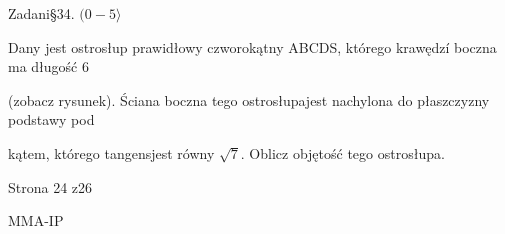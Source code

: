 \documentclass[a4paper,12pt]{article}
\begin{document}
Zadani\S 34. $(0-5\rangle$

Dany jest ostrosłup prawidłowy czworokątny ABCDS, którego krawędzí boczna ma długość 6

(zobacz rysunek). Ściana boczna tego ostrosłupajest nachylona do płaszczyzny podstawy pod

kątem, którego tangensjest równy $\sqrt{7}$. Oblicz objętość tego ostrosłupa.

Strona 24 z26

MMA-IP
\end{document}

